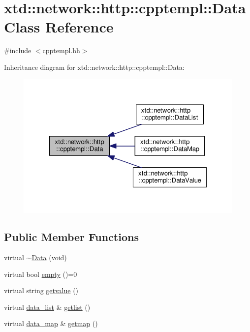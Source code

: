\hypertarget{classxtd_1_1network_1_1http_1_1cpptempl_1_1Data}{\section{xtd\-:\-:network\-:\-:http\-:\-:cpptempl\-:\-:Data Class Reference}
\label{classxtd_1_1network_1_1http_1_1cpptempl_1_1Data}
}


{\ttfamily \#include $<$cpptempl.\-hh$>$}



Inheritance diagram for xtd\-:\-:network\-:\-:http\-:\-:cpptempl\-:\-:Data\-:
\nopagebreak
\begin{figure}[H]
\begin{center}
\leavevmode
\includegraphics[width=324pt]{classxtd_1_1network_1_1http_1_1cpptempl_1_1Data__inherit__graph}
\end{center}
\end{figure}
\subsection*{Public Member Functions}
\begin{DoxyCompactItemize}
\item 
virtual \hyperlink{classxtd_1_1network_1_1http_1_1cpptempl_1_1Data_a4bbb052aa314ffb321edee297cf393e1}{$\sim$\-Data} (void)
\item 
virtual bool \hyperlink{classxtd_1_1network_1_1http_1_1cpptempl_1_1Data_a3a64cba1d65950fababffac694561af1}{empty} ()=0
\item 
virtual string \hyperlink{classxtd_1_1network_1_1http_1_1cpptempl_1_1Data_a85999dd8f43177cabf072ddbc406e556}{getvalue} ()
\item 
virtual \hyperlink{namespacextd_1_1network_1_1http_1_1cpptempl_aff1b51bcf8064f69c85dd4833c1853b4}{data\-\_\-list} \& \hyperlink{classxtd_1_1network_1_1http_1_1cpptempl_1_1Data_abb82f257b867cd0da2469cc6c5ecdbae}{getlist} ()
\item 
virtual \hyperlink{namespacextd_1_1network_1_1http_1_1cpptempl_a638d1d81c8fb63c0bbafd508d6a2a007}{data\-\_\-map} \& \hyperlink{classxtd_1_1network_1_1http_1_1cpptempl_1_1Data_a39713cc7cdc05a2375c1c5d4f00772db}{getmap} ()
\end{DoxyCompactItemize}


